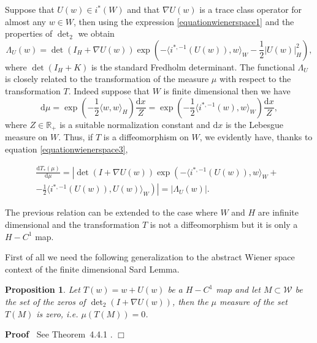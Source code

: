 \documentclass[a4paper,10pt]{article}
\newcommand{\asterisk}{\mathord{*}}
\newcommand{\mathd}{\mathrm{d}}
\newenvironment{proof}{\noindent\textbf{Proof\ }}{\hspace*{\fill}$\Box$\medskip}
\newtheorem{proposition}[theorem]{Proposition}
{\theorembodyfont{\rmfamily}\newtheorem{remark}[theorem]{Remark}}
\begin{document}
Suppose that $U (w) \in i^{\asterisk} (W)$ and that $\nabla U (w)$ is a trace
class operator for almost any $w \in W$, then using the expression
{\eqref{equationwienerspace1}} and the properties of $\det_2$ we obtain
\begin{equation}
  \Lambda_U (w) = \det (I_H + \nabla U (w)) \exp \left( - \langle
  i^{\asterisk, - 1} (U (w)), w \rangle_W - \frac{1}{2} | U (w) |^2_H \right)
  \label{equationwienerspace3},
\end{equation}
where $\det (I_H + K)$ is the standard Fredholm determinant. The functional
$\Lambda_U$ is closely related to the transformation of the measure $\mu$ with
respect to the transformation $T$. Indeed suppose that $W$ is finite
dimensional then we have
\[ \mathd \mu = \exp \left( - \frac{1}{2} \langle w, w \rangle_H \right)
   \frac{\mathd x}{Z} = \exp \left( - \frac{1}{2} \langle i^{\asterisk, - 1}
   (w), w \rangle_W \right) \frac{\mathd x}{Z}, \]
where $Z \in \mathbb{R}_+$ is a suitable normalization constant and $\mathd x$
is the Lebesgue measure on $W$. Thus, if $T$ is a diffeomorphism on $W$, we
evidently have, thanks to equation {\eqref{equationwienerspace3}},

\begin{multline*}
  \frac{\mathd T_{\asterisk} (\mu)}{\mathd \mu} = \left. \left. \left| \det (I
  + \nabla U (w)) \exp \left( - \langle i^{\asterisk, - 1} (U (w)), w
  \rangle_W + \phantom{\frac{1}{2}} \right. \right. \right. \right.\\
  \left. \left. \left. \left. - \frac{1}{2} \langle i^{\asterisk, - 1} (U
  (w)), U (w) \rangle_W \right) \right| \right. \right. = | \Lambda_U (w) | .
\end{multline*}

The previous relation can be extended to the case where $W$ and $H$ are
infinite dimensional and the transformation $T$ is not a diffeomorphism but it
is only a $H - C^1$ map.

First of all we need the following generalization to the abstract Wiener
space context of the finite dimensional Sard Lemma.

\begin{proposition}
  \label{proposition_Sard}Let $T (w) = w + U (w)$ be a $H - C^1$ map and let
  $M \subset \mathcal{W}$ be the set of the zeros of $\det_2 (I + \nabla U
  (w))$, then the $\mu$ measure of the set $T (M)$ is zero, i.e. $\mu (T (M))
  = 0$.
\end{proposition}

\begin{proof}
  See Theorem~4.4.1 {\cite{Ustunel2000}}.
\end{proof}
\end{document}
